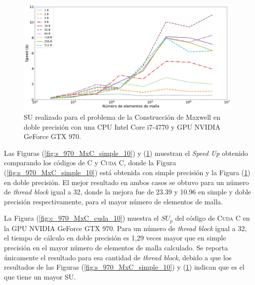 \begin{figure}[htbp]
	\centering
	\includegraphics[width=0.99\textwidth]{figs/cap4/s_970_MxC_double_10}
	\caption{SU realizado para el problema de la Construcción de Maxwell en doble precisión con una CPU Intel Core i7-4770 y GPU NVIDIA GeForce GTX 970.} 
	\label{fig:s_970_MxC_double_10}	
\end{figure}

\newpage

Las Figuras (\ref{fig:s_970_MxC_simple_10}) y (\ref{fig:s_970_MxC_double_10}) muestran el \textit{Speed Up} obtenido comparando los códigos de \textsc{C} y \textsc{Cuda C}, donde la Figura (\ref{fig:s_970_MxC_simple_10}) está obtenida con simple precisión y la Figura (\ref{fig:s_970_MxC_double_10}) en doble precisión. El mejor resultado en ambos casos se obtuvo para un número de \textit{thread block} igual a 32, donde la mejora fue de 23.39 y 10.96 en simple y doble precisión respectivamente, para el mayor número de elementos de malla.

La Figura (\ref{fig:c_970_MxC_cuda_10}) muestra el ${SU}_p$ del código de \textsc{Cuda C} en la GPU NVIDIA GeForce GTX 970. Para un número de \textit{thread block} igual a 32, el tiempo de cálculo en doble precisión es 1,29 veces mayor que en simple precisión en el mayor número de elementos de malla calculado. Se reporta únicamente el resultado para esa cantidad de \textit{thread block}, debido a que los resultados de las Figuras (\ref{fig:s_970_MxC_simple_10}) y (\ref{fig:s_970_MxC_double_10}) indican que es el que tiene un mayor SU.


